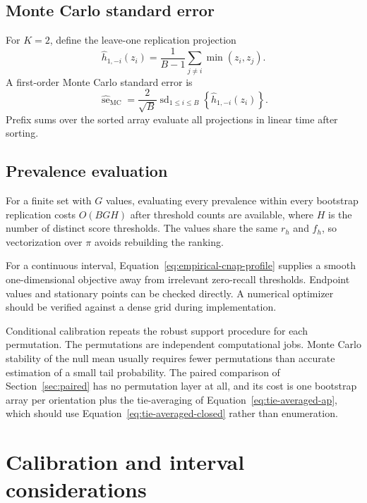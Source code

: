 \documentclass[11pt]{article}
\theoremstyle{remark}
\begin{document}
\subsection{Monte Carlo standard error}

For $K=2$, define the leave-one replication projection
\[
\widehat h_{1,-i}(z_i)
=
\frac{1}{B-1}
\sum_{j\ne i}
\min(z_i,z_j).
\]
A first-order Monte Carlo standard error is
\begin{equation}
\widehat{\operatorname{se}}_{\mathrm{MC}}
=
\frac{2}{\sqrt B}
\operatorname{sd}_{1\leq i\leq B}
\left\{
\widehat h_{1,-i}(z_i)
\right\}.
\label{eq:mcse}
\end{equation}
Prefix sums over the sorted array evaluate all projections in linear time after sorting.

\subsection{Prevalence evaluation}

For a finite set with $G$ values, evaluating every prevalence within every bootstrap replication costs $O(BGH)$ after threshold counts are available, where $H$ is the number of distinct score thresholds. The values share the same $r_h$ and $f_h$, so vectorization over $\pi$ avoids rebuilding the ranking.

For a continuous interval, Equation~\eqref{eq:empirical-cnap-profile} supplies a smooth one-dimensional objective away from irrelevant zero-recall thresholds. Endpoint values and stationary points can be checked directly. A numerical optimizer should be verified against a dense grid during implementation.

Conditional calibration repeats the robust support procedure for each permutation. The permutations are independent computational jobs. Monte Carlo stability of the null mean usually requires fewer permutations than accurate estimation of a small tail probability. The paired comparison of Section~\ref{sec:paired} has no permutation layer at all, and its cost is one bootstrap array per orientation plus the tie-averaging of Equation~\eqref{eq:tie-averaged-ap}, which should use Equation~\eqref{eq:tie-averaged-closed} rather than enumeration.

\section{Calibration and interval considerations}
\label{app:calibration}
\end{document}
